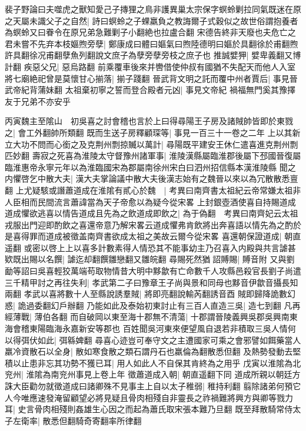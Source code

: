 裴子野論曰夫噬虎之獸知愛己子摶狸之鳥非護異巢太宗保字螟蛉剿拉同氣既迷在原之天屬未識父子之自然|{
	詩曰螟蛉之子蜾羸負之教誨爾子式穀似之故世俗謂抱養者為螟蛉又曰眷令在原兄弟急難剿子小翻絶也拉盧合翻}
宋德告終非天廢也夫危亡之君未嘗不先弃本枝嫗煦旁孽|{
	鄭康成曰體曰嫗氣曰煦陸德明曰嫗於具翻徐於甫翻煦許具翻徐况甫翻孽魚列翻說文庶子為孽旁孽旁枝之庶子也}
推誠嬖狎|{
	嬖卑義翻又博計翻}
疾惡父兄|{
	惡烏路翻}
前乘覆車後來并轡借使仲叔有國猶不失配天而他人入室將七廟絶祀曾是莫懷甘心揃落|{
	揃子踐翻}
晉武背文明之託而覆中州者賈后|{
	事見晉武帝紀背蒲妹翻}
太祖棄初寧之誓而登合殿者元凶|{
	事見文帝紀}
禍福無門奚其豫擇友于兄弟不亦安乎

丙寅魏主至隂山　初吳喜之討會稽也言於上曰得尋陽王子房及諸賊帥皆即於東戮之|{
	會工外翻帥所類翻}
既而生送子房釋顧琛等|{
	事見一百三十一卷之二年}
上以其新立大功不問而心銜之及克荆州剽掠贓以萬計|{
	尋陽既平建安王休仁遣喜進克荆州剽匹妙翻}
壽寂之死喜為淮陵太守督豫州諸軍事|{
	淮陵漢縣屬臨淮郡後屬下邳國晉復屬臨淮惠帝永寧元年以為淮臨國宋為郡屬南徐州宋白曰泗州招信縣本漢淮陵縣}
聞之内懼啓乞中散大夫|{
	漢大夫掌論議中散大夫後漢志始有之魏晉以來以為冗散散悉亶翻}
上尤疑駭或譖蕭道成在淮隂有貳心於魏　|{
	考異曰南齊書太祖紀云帝常嫌太祖非人臣相而民間流言蕭諱當為天子帝愈以為疑今從宋畧}
上封銀壺酒使喜自持賜道成道成懼欲逃喜以情告道成且先為之飲道成即飲之|{
	為于偽翻　考異曰南齊妃云太祖戎服出門迎即酌飲之喜還帝意乃解宋畧云道成懼弗肯飲將出奔喜語以情先為之酌於是喜得罪而道成被徵盖南齊書欲成太祖之美故云爾今從宋畧}
喜還朝保證道成|{
	朝直遥翻}
或密以啓上上以喜多計數素得人情恐其不能事幼主乃召喜入内殿與共言謔甚欵既出賜以名饌|{
	謔迄却翻饌雛戀翻又雛皖翻}
尋賜死然猶詔賻賜|{
	賻音附}
又與劉勔等詔曰吳喜輕狡萬端苟取物情昔大明中黟歙有亡命數千人攻縣邑殺官長劉子尚遣三千精甲討之再往失利|{
	孝武第二子曰豫章王子尚與景和同母也黟音伊歙音攝長知兩翻}
孝武以喜將數十人至縣說誘羣賊|{
	將即亮翻說輸芮翻誘音酉}
賊即歸降詭數幻惑|{
	詭過委翻幻戶辦翻}
乃能如此及泰始初東討止有三百人直造三吳|{
	造七到翻}
凡再經薄戰|{
	薄伯各翻}
而自破岡以東至海十郡無不清蕩|{
	十郡謂晉陵義興吳郡吳興南東海會稽東陽臨海永嘉新安等郡也}
百姓聞吳河東來便望風自退若非積取三吳人情何以得弭伏如此|{
	弭緜婢翻}
尋喜心迹豈可奉守文之主遭國家可乘之會邪譬如餌藥當人羸冷資散石以全身|{
	散如寒食散之類石謂丹石也羸倫為翻散悉但翻}
及熱勢發動去堅積以止患非忘其功勢不獲已耳|{
	用人如此人不自保其肯終為之用乎}
戊寅以淮隂為北兖州|{
	淮隂為南兖州事見上卷上年}
徵蕭道成入朝|{
	朝直遥翻下同}
道成所親以朝廷方誅大臣勸勿就徵道成曰諸卿殊不見事主上自以太子稚弱|{
	稚持利翻}
翦除諸弟何預它人今唯應速發淹留顧望必將見疑且骨肉相殘自非靈長之祚禍難將興方與卿等戮力耳|{
	史言骨肉相殘則姦雄生心因之而起為蕭氏取宋張本難乃旦翻}
既至拜散騎常侍太子左衛率|{
	散悉但翻騎奇寄翻率所律翻}
